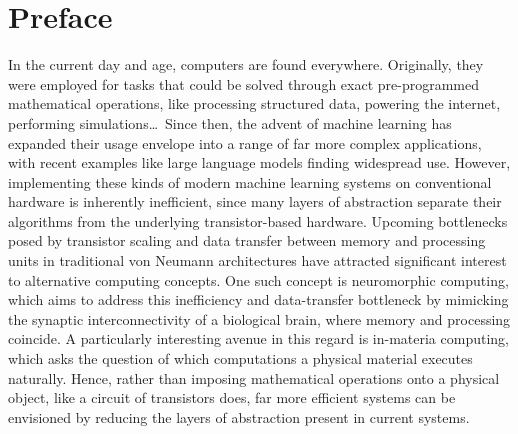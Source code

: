 \chapter*{Preface}\label{sec:Preface_EN}
In the current day and age, computers are found everywhere.
Originally, they were employed for tasks that could be solved through exact pre-programmed mathematical operations, like processing structured data, powering the internet, performing simulations\dots\,
Since then, the advent of machine learning has expanded their usage envelope into a range of far more complex applications, with recent examples like large language models finding widespread use.
However, implementing these kinds of modern machine learning systems on conventional hardware is inherently inefficient, since many layers of abstraction separate their algorithms from the underlying transistor-based hardware.
Upcoming bottlenecks posed by transistor scaling and data transfer between memory and processing units in traditional von Neumann architectures have attracted significant interest to alternative computing concepts.
One such concept is neuromorphic computing, which aims to address this inefficiency and data-transfer bottleneck by mimicking the synaptic interconnectivity of a biological brain, where memory and processing coincide.
A particularly interesting avenue in this regard is in-materia computing, which asks the question of which computations a physical material executes naturally.
Hence, rather than imposing mathematical operations onto a physical object, like a circuit of transistors does, far more efficient systems can be envisioned by reducing the layers of abstraction present in current systems. \\ %

